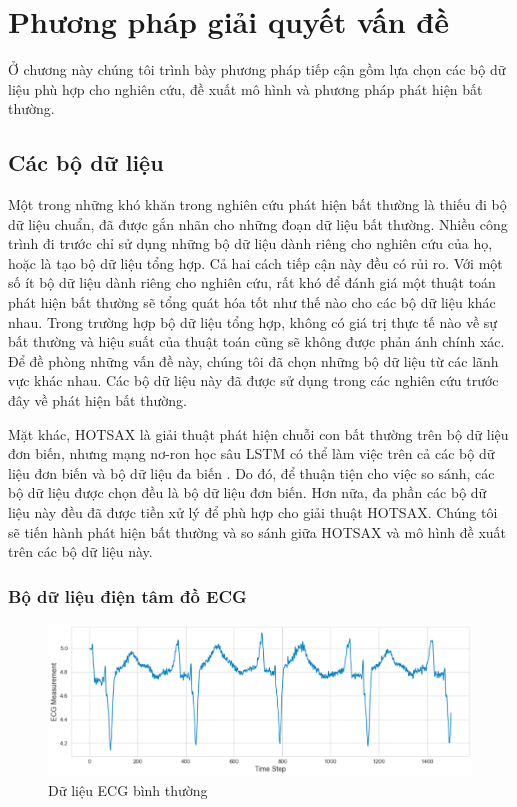 \chapter{Phương pháp giải quyết vấn đề}
Ở chương này chúng tôi trình bày phương pháp tiếp cận gồm lựa chọn các bộ dữ liệu phù hợp cho nghiên cứu, đề xuất mô hình và phương pháp phát hiện bất thường.

\section{Các bộ dữ liệu}
Một trong những khó khăn trong nghiên cứu phát hiện bất thường là thiếu đi bộ dữ liệu chuẩn, đã được gắn nhãn cho những đoạn dữ liệu bất thường. Nhiều công trình đi trước chỉ sử dụng những bộ dữ liệu dành riêng cho nghiên cứu của họ, hoặc là tạo bộ dữ liệu tổng hợp. Cả hai cách tiếp cận này đều có rủi ro. Với một số ít bộ dữ liệu dành riêng cho nghiên cứu, rất khó để đánh giá một thuật toán phát hiện bất thường sẽ tổng quát hóa tốt như thế nào cho các bộ dữ liệu khác nhau. Trong trường hợp bộ dữ liệu tổng hợp, không có giá trị thực tế nào về sự bất thường và hiệu suất của thuật toán cũng sẽ không được phản ánh chính xác. Để đề phòng những vấn đề này, chúng tôi đã chọn những bộ dữ liệu từ các lãnh vực khác nhau. Các bộ dữ liệu này đã được sử dụng trong các nghiên cứu trước đây về phát hiện bất thường.

Mặt khác, HOTSAX là giải thuật phát hiện chuỗi con bất thường trên bộ dữ liệu đơn biến, nhưng mạng nơ-ron học sâu LSTM có thể làm việc trên cả các bộ dữ liệu đơn biến và bộ dữ liệu đa biến \cite{st32}. Do đó, để thuận tiện cho việc so sánh, các bộ dữ liệu được chọn đều là bộ dữ liệu đơn biến. Hơn nữa, đa phần các bộ dữ liệu này đều đã được tiền xử lý để phù hợp cho giải thuật HOTSAX. Chúng tôi sẽ tiến hành phát hiện bất thường và so sánh giữa HOTSAX và mô hình đề xuất trên các bộ dữ liệu này.

\subsection{Bộ dữ liệu điện tâm đồ ECG}
\begin{figure}[H]
    \centering
    \includegraphics[scale=0.75]{./content/images/4-5.png}
    \caption{Dữ liệu ECG bình thường}
    \label{fig:4-5}
\end{figure}

